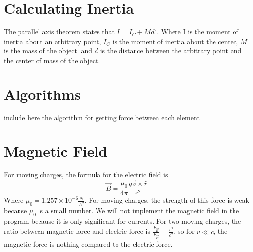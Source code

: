 \documentclass{article}
\begin{document}
\section{Calculating Inertia}
The parallel axis theorem states that $I = I_C + Md^2$. Where I is the moment of inertia about an arbitrary point, $I_C$ is the moment of inertia about the center, $M$ is the mass of the object, and $d$ is the distance between the arbitrary point and the center of mass of the object.

\section{Algorithms}
include here the algorithm for getting force between each element

\section{Magnetic Field}
For moving charges, the formula for the electric field is
\begin{equation}
    \vec{B} = \frac{\mu _0}{4\pi}\frac{q\vec{v}\times\hat{r}}{r^2}
\end{equation}
Where $\mu _0 = 1.257\times 10^{-6} \si{\frac{N}{A^2}}$. For moving charges, the strength of this force is weak because $\mu _0$ is a small number. We will not implement the magnetic field in the program because it is only significant for currents. For two moving charges, the ratio between magnetic force and electric force is $\frac{ F_{\vec{B}} }{F_{\vec{E}} } = \frac{v^2}{c^2}$, so for $v \ll c $, the magnetic force is nothing compared to the electric force.
\end{document}
